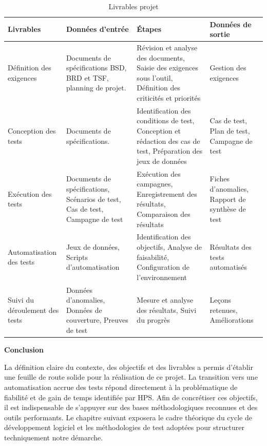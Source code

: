 \begin{table}[H]
\centering\footnotesize
\caption{Livrables projet}
\begin{tabularx}{\textwidth}{l X X X}
\toprule
\textbf{Livrables} & \textbf{Données d'entrée} & \textbf{Étapes} & \textbf{Données de sortie} \\
\midrule
Définition des exigences & Documents de spécifications BSD, BRD et TSF, planning de projet. & Révision et analyse des documents, Saisie des exigences sous l'outil, Définition des criticités et priorités & Gestion des exigences \\
\midrule
Conception des tests & Documents de spécifications. & Identification des conditions de test, Conception et rédaction des cas de test, Préparation des jeux de données & Cas de test, Plan de test, Campagne de test \\
\midrule
Exécution des tests & Documents de spécifications, Scénarios de test, Cas de test, Campagne de test & Exécution des campagnes, Enregistrement des résultats, Comparaison des résultats & Fiches d'anomalies, Rapport de synthèse de test \\
\midrule
Automatisation des tests & Jeux de données, Scripts d'automatisation & Identification des objectifs, Analyse de faisabilité, Configuration de l'environnement & Résultats des tests automatisés \\
\midrule
Suivi du déroulement des tests & Données d'anomalies, Données de couverture, Preuves de test & Mesure et analyse des résultats, Suivi du progrès & Leçons retenues, Améliorations \\
\bottomrule
\end{tabularx}
\end{table}

\vspace{10pt}
\textbf{Conclusion}

La définition claire du contexte, des objectifs et des livrables a permis d'établir une feuille de route solide pour la réalisation de ce projet. La transition vers une automatisation accrue des tests répond directement à la problématique de fiabilité et de gain de temps identifiée par HPS. Afin de concrétiser ces objectifs, il est indispensable de s'appuyer sur des bases méthodologiques reconnues et des outils performants. Le chapitre suivant exposera le cadre théorique du cycle de développement logiciel et les méthodologies de test adoptées pour structurer techniquement notre démarche.

